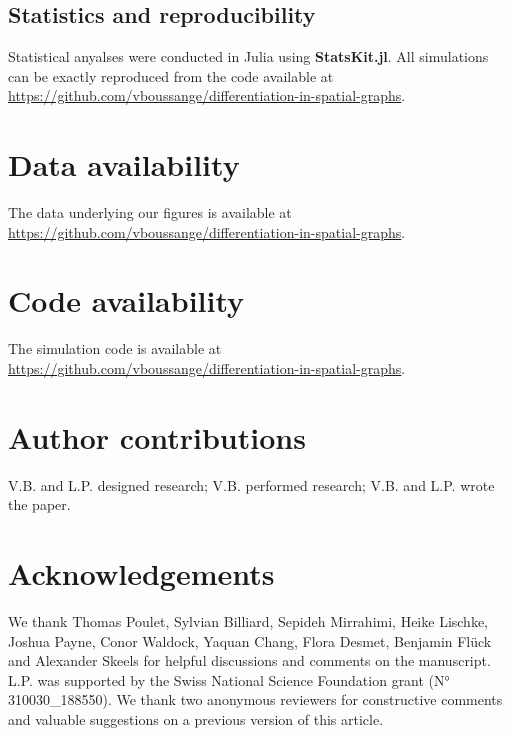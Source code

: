 \subsection{Statistics and reproducibility}
Statistical anyalses were conducted in Julia using \textbf{StatsKit.jl}. 
%
All simulations can be exactly reproduced from the code available at \href{https://github.com/vboussange/differentiation-in-spatial-graphs}{https://github.com/vboussange/differentiation-in-spatial-graphs}.

\section*{Data availability}
The data underlying our figures is available at \href{https://github.com/vboussange/differentiation-in-spatial-graphs}{https://github.com/vboussange/differentiation-in-spatial-graphs}.

\section*{Code availability}

The simulation code is available at \href{https://github.com/vboussange/differentiation-in-spatial-graphs}{https://github.com/vboussange/differentiation-in-spatial-graphs}.

\section*{Author contributions}
V.B. and L.P. designed research; V.B. performed research; V.B. and L.P. wrote the paper.

\section*{Acknowledgements}
We thank Thomas Poulet, Sylvian Billiard, Sepideh Mirrahimi, Heike Lischke, Joshua Payne, Conor Waldock, Yaquan Chang, Flora Desmet, Benjamin Flück and Alexander Skeels for helpful discussions and comments on the manuscript. L.P. was supported by the Swiss National Science Foundation grant (N° 310030\_188550).
We thank two anonymous reviewers for constructive comments and valuable suggestions on a previous version of this article.
  
  
